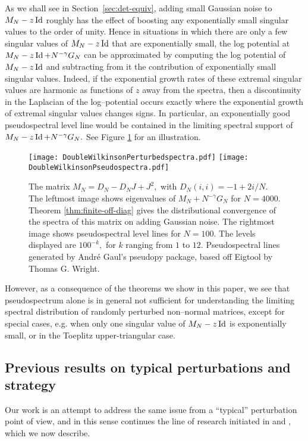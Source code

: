 \documentclass{amsart}
\numberwithin{equation}{section}
\begin{document}
As we shall see in Section~\ref{sec:det-equiv}, adding small
Gaussian noise to $M_N - z\operatorname{Id}$ roughly has the effect of boosting any exponentially small singular values to the order of unity.  Hence in situations in which there are only a few singular values of $M_N -z\operatorname{Id}$ that are exponentially small, the log potential at $M_N -z\operatorname{Id} + N^{-\gamma}G_N$ can be approximated by computing the log potential of $M_N -z\operatorname{Id}$ and subtracting from it the contribution of exponentially small singular values.  Indeed, if the exponential growth rates of these extremal singular values are harmonic as functions of $z$ away from the spectra, then a discontinuity in the Laplacian of the log--potential occurs exactly where the exponential growth of extremal singular values changes signs.  In particular, an exponentially good pseudospectral level line would be contained in the limiting spectral support of $M_N - z\operatorname{Id} + N^{-\gamma}G_N.$ See Figure \ref{fig:3} for an illustration.
\begin{figure}[t]
\begin{center}
  \texttt{[image: DoubleWilkinsonPerturbedspectra.pdf]}
  \texttt{[image: DoubleWilkinsonPseudospectra.pdf]}
\caption{
  The matrix $M_N = D_N - D_NJ + J^2,$ with $D_N(i,i)=-1+2i/N.$
  The leftmost image shows eigenvalues of $M_N + N^{-\gamma}G_N$ for $N=4000.$  Theorem \ref{thm:finite-off-diag} gives the distributional convergence of the spectra of this matrix on adding Gaussian noise.
  The rightmost image shows pseudospectral level lines for $N=100.$ The levels displayed are $100^{-k},$ for $k$ ranging from $1$ to $12.$
  Pseudospectral lines generated by Andr\'e Gaul's pseudopy package, based off Eigtool by Thomas G. Wright.
 }
\label{fig:3}
\end{center}
\end{figure}

However, as a consequence of the theorems we show in this paper, we see that pseudospectrum alone is in general
not sufficient for understanding the limiting spectral distribution of randomly perturbed non--normal matrices, except for special cases, e.g. when
only one singular value of $M_N - z\operatorname{Id}$ is exponentially small, or in the
Toeplitz upper-triangular case.  

\subsection{Previous results on typical perturbations and strategy}
\label{subsec-1.4}
Our work is an attempt
to address the same issue from a ``typical'' perturbation point of view, and
in this sense continues the line of research initiated in \cite{GWZ,W} and
\cite{FPZ}, which we now describe.
\end{document}
